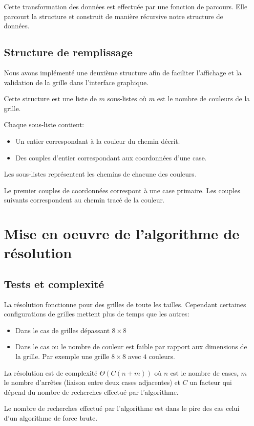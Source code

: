 Cette transformation des données est effectuée par une fonction de parcours. Elle parcourt la structure et construit de manière récursive notre structure de données. 

\subsection{Structure de remplissage}

Nous avons implémenté une deuxième structure afin de faciliter l'affichage et la validation de la grille dans l'interface graphique.

Cette structure est une liste de $m$ sous-listes où $m$ est le nombre de couleurs de la grille.

Chaque sous-liste contient:
\begin{itemize}
	\item Un entier correspondant à la couleur du chemin décrit.
    \item Des couples d'entier correspondant aux coordonnées d'une case.
\end{itemize}

Les sous-listes représentent les chemins de chacune des couleurs.

Le premier couples de coordonnées correspont à une case primaire. Les couples suivants correspondent au chemin tracé de la couleur.\\

\section{Mise en oeuvre de l'algorithme de résolution}

\subsection{Tests et complexité}

La résolution fonctionne pour des grilles de toute les tailles. Cependant certaines configurations de grilles mettent plus de temps que les autres:\\
\begin{itemize}
	\item Dans le cas de grilles dépassant $8\times 8$
    \item Dans le cas ou le nombre de couleur est faible par rapport aux dimensions de la grille. Par exemple une grille $8\times 8$ avec $4$ couleurs.
\end{itemize}

La résolution est de complexité $\Theta(C(n+m))$ où $n$ est le nombre de cases, $m$ le nombre d'arrêtes (liaison entre deux cases adjacentes) et $C$ un facteur qui dépend du nombre de recherches effectué par l'algorithme.

Le nombre de recherches effectué par l'algorithme est dans le pire des cas celui d'un algorithme de force brute.
